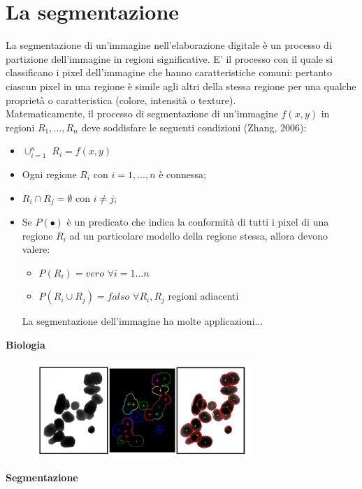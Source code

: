 \section{La segmentazione}
La segmentazione di un'immagine nell'elaborazione digitale è un processo di partizione dell'immagine in regioni significative.
E' il processo con il quale si classificano i pixel dell'immagine che hanno caratteristiche comuni: pertanto ciascun pixel in una regione
è simile agli altri della stessa regione per una qualche proprietà o
caratteristica (colore, intensità o texture).
\\Matematicamente, il processo di segmentazione di un'immagine $f(x,y)$ in regioni $R_1,...,R_n$ deve soddisfare le seguenti condizioni (Zhang, 2006):
\begin{itemize}
    \item $\cup^n_{i=1}$ $R_i = f(x,y)$
    \item Ogni regione $R_i$ con $i=1,...,n$ è connessa;
    \item $R_i \cap R_j = \emptyset$ con $i \neq j$;
    \item Se $P(•)$ è un predicato che indica la conformità di tutti i pixel
          di una regione $R_i$ ad un particolare modello della regione
          stessa, allora devono valere:
          \begin{itemize}
              \item $P(R_i) = vero$ $\forall i = 1...n$
              \item $P(R_i \cup R_j) = falso$ $\forall R_i, R_j$ regioni adiacenti
          \end{itemize}
          La segmentazione dell'immagine ha molte applicazioni...
\end{itemize}
\textbf{Biologia}
\begin{figure}[H]
    \centering
    \includegraphics[width=\linewidth, keepaspectratio]{capitoli/immagini/imgs/biologia.png}
\end{figure}
\textbf{Segmentazione}

